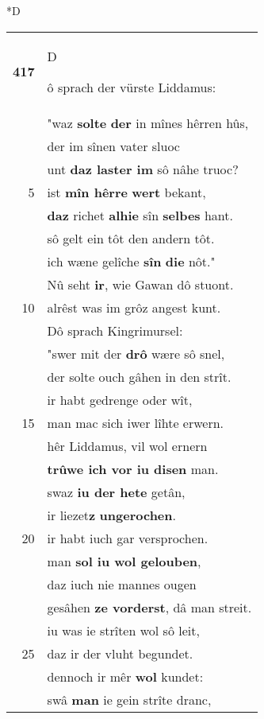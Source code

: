 \documentclass[8pt,a4paper,notitlepage]{article}
\begin{document}
\begin{table}[ht]
\begin{minipage}[t]{0.5\linewidth}
\small
\begin{center}*D
\end{center}
\begin{tabular}{rl}
\textbf{417} & \begin{large}D\end{large}ô sprach der vürste Liddamus:\\ 
 & "waz \textbf{solte} \textbf{der} in mînes hêrren hûs,\\ 
 & der im sînen vater sluoc\\ 
 & unt \textbf{daz laster im} sô nâhe truoc?\\ 
5 & ist \textbf{mîn hêrre} \textbf{wert} bekant,\\ 
 & \textbf{daz} richet \textbf{alhie} sîn \textbf{selbes} hant.\\ 
 & sô gelt ein tôt den andern tôt.\\ 
 & ich wæne gelîche \textbf{sîn} \textbf{die} nôt."\\ 
 & Nû seht \textbf{ir}, wie Gawan dô stuont.\\ 
10 & alrêst was im grôz angest kunt.\\ 
 & Dô sprach Kingrimursel:\\ 
 & "swer mit der \textbf{drô} wære sô snel,\\ 
 & der solte ouch gâhen in den strît.\\ 
 & ir habt gedrenge oder wît,\\ 
15 & man mac sich iwer lîhte erwern.\\ 
 & hêr Liddamus, vil wol ernern\\ 
 & \textbf{trûwe ich vor iu disen} man.\\ 
 & swaz \textbf{iu der hete} getân,\\ 
 & ir liezet\textbf{z} \textbf{ungerochen}.\\ 
20 & ir habt iuch gar versprochen.\\ 
 & man \textbf{sol iu wol gelouben},\\ 
 & daz iuch nie mannes ougen\\ 
 & gesâhen \textbf{ze vorderst}, dâ man streit.\\ 
 & iu was ie strîten wol sô leit,\\ 
25 & daz ir der vluht begundet.\\ 
 & dennoch ir mêr \textbf{wol} kundet:\\ 
 & swâ \textbf{man} ie gein strîte dranc,\\ 

\end{tabular}
\end{minipage}
\end{table}
\end{document}
